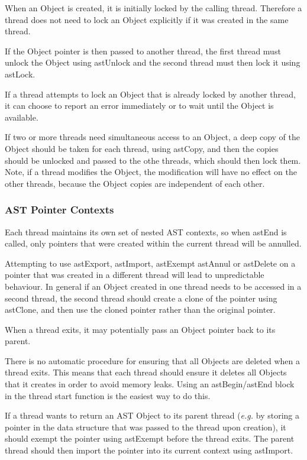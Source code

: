 \documentclass[twoside,11pt]{article}
\begin{document}
When an Object is created, it is initially locked by the calling thread.
Therefore a thread does not need to lock an Object explicitly if it was
created in the same thread.

If the Object pointer is then passed to another thread, the first thread
must unlock the Object using astUnlock and the second thread must then lock
it using astLock.

If a thread attempts to lock an Object that is already locked by another
thread, it can choose to report an error immediately or to wait until the 
Object is available.

If two or more threads need simultaneous access to an Object, a deep copy
of the Object should be taken for each thread, using astCopy, and then
the copies should be unlocked and passed to the othe threads, which
should then lock them. Note, if a thread modifies the Object, the
modification will have no effect on the other threads, because the Object
copies are independent of each other.

\subsubsection{AST Pointer Contexts}

Each thread maintains its own set of nested AST contexts, so when astEnd
is called, only pointers that were created within the current thread will
be annulled.

Attempting to use astExport, astImport, astExempt astAnnul or astDelete on 
a pointer that was created in a different thread will lead to unpredictable 
behaviour. In general if an Object created in one thread needs to be
accessed in a second thread, the second thread should create a clone of
the pointer using astClone, and then use the cloned pointer rather than
the original pointer.

When a thread exits, it may potentially pass an Object pointer back to
its parent. 

There is no automatic procedure for ensuring that all Objects are deleted
when a thread exits. This means that each thread should ensure it deletes 
all Objects that it creates in order to avoid memory leaks. Using an
astBegin/astEnd block in the thread start function is the easiest way to
do this. 

If a thread wants to return an AST Object to its parent thread
(\emph{e.g.} by storing a pointer in the data structure that was passed to
the thread upon creation), it should
exempt the pointer using astExempt before the thread exits. The parent
thread should then import the pointer into its current context using 
astImport.
\end{document}
